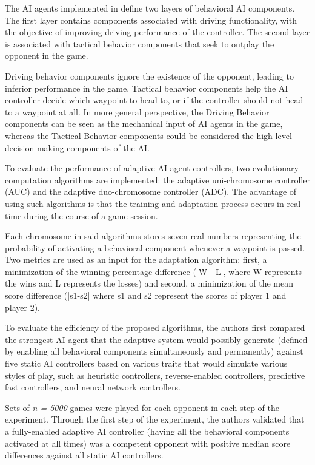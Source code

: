 The AI agents implemented in \cite{article_adaptivebehaviorai} define two layers of behavioral AI components. The first layer contains components associated with driving functionality, with the objective of improving driving performance of the controller. The second layer is associated with tactical behavior components that seek to outplay the opponent in the game.

Driving behavior components ignore the existence of the opponent, leading to inferior performance in the game. Tactical behavior components help the AI controller decide which waypoint to head to, or if the controller should not head to a waypoint at all. In more general perspective, the Driving Behavior components can be seen as the mechanical input of AI agents in the game, whereas the Tactical Behavior components could be considered the high-level decision making components of the AI.

To evaluate the performance of adaptive AI agent controllers, two evolutionary computation algorithms are implemented: the adaptive uni-chromosome controller (AUC) and the adaptive duo-chromosome controller (ADC). The advantage of using such algorithms is that the training and adaptation process occurs in real time during the course of a game session.

Each chromosome in said algorithms stores seven real numbers representing the probability of activating a behavioral component whenever a waypoint is passed. Two metrics are used as an input for the adaptation algorithm: first, a minimization of the winning percentage difference (|W - L|, where W represents the wins and L represents the losses) and second, a minimization of the mean score difference (|s1-s2| where s1 and s2 represent the scores of player 1 and player 2).

To evaluate the efficiency of the proposed algorithms, the authors first compared the strongest AI agent that the adaptive system would possibly generate (defined by enabling all behavioral components simultaneously and permanently) against five static AI controllers based on various traits that would simulate various styles of play, such as heuristic controllers, reverse-enabled controllers, predictive fast controllers, and neural network controllers.

Sets of \emph{n = 5000} games were played for each opponent in each step of the experiment. Through the first step of the experiment, the authors validated that a fully-enabled adaptive AI controller (having all the behavioral components activated at all times) was a competent opponent with positive median score differences against all static AI controllers.

